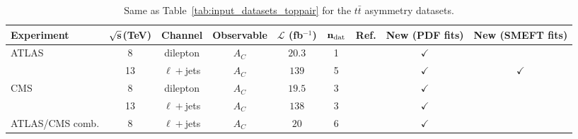 \begin{table}[H]
  \begin{center}
{\fontsize{8pt}{8pt}\selectfont
  \centering
   \renewcommand{\arraystretch}{1.5}
   \setlength{\tabcolsep}{2pt}
   \begin{tabular}{lcccccc|c|c}
     \toprule \textbf{Experiment}     & $\bf{\sqrt{s}}$\textbf{(TeV)}
     & \textbf{Channel}  &  \textbf{Observable} & $\mathcal{L}$ (fb${}^{-1}$) & $\mathbf{n_{\rm dat}}$ & \textbf{Ref.}   &\textbf{New (PDF fits)}
    &  \textbf{New (SMEFT fits)} \\
    \toprule
      \multirow{2}{*}{ATLAS}
      & 8
      & dilepton
      & $A_C$
      & $20.3$
      & 1
      & \cite{Aad:2016ove}
      & $\checkmark$                                                                     
      &  \\
      & 13
      & $\ell+$jets
      & $A_C$
      & $139$
      & 5
      & \cite{ATLAS:2022waa}
      & $\checkmark$                                                                     
      & $\checkmark$   \\
     \midrule
      \multirow{2}{*}{CMS}
      & 8
      & dilepton
      & $A_C$
      & $19.5$
      & 3
      & \cite{Khachatryan:2016ysn}
      & $\checkmark$                                                                     
      &  \\
      & 13
      & $\ell+$jets
      & $A_C$
      & $138$
      & 3
      & \cite{CMS-PAS-TOP-21-014}
      & $\checkmark$                                                                     
      &  \\
\midrule
      ATLAS/CMS comb.
      & 8
      & $\ell+$jets
      & $A_C$
      & $20$
      & 6
      & \cite{Sirunyan:2017lvd}
      & $\checkmark$                                                                     
      &  \\
\bottomrule
   \end{tabular}
   \vspace{0.3cm}
   \caption{\small Same as Table~\ref{tab:input_datasets_toppair} for the $t\bar{t}$
     asymmetry datasets.
   \label{tab:input_datasets_topasymmetries} \label{tab:asymmetries}
}
}
\end{center}
\end{table}
